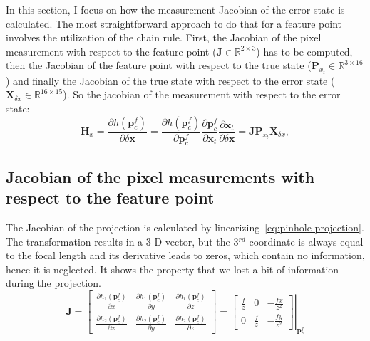 In this section, I focus on how the measurement Jacobian of the error state is calculated. The most straightforward approach to do that for a feature point involves the utilization of the chain rule. First, the Jacobian of the pixel measurement with respect to the feature point ($\mathbf{J}\in\mathbb{R}^{2\times3}$) has to be computed, then the Jacobian of the feature point with respect to the true state ($\mathbf{P}_{x_t}\in\mathbb{R}^{3\times 16}$) and finally the Jacobian of the true state with respect to the error state ($\mathbf{X}_{\delta x}\in\mathbb{R}^{16\times 15}$). So the jacobian of the measurement with respect to the error state:
\begin{equation}
    \mathbf{H}_x=\frac{\partial h(\mathbf{p}_c^f)}{\partial\delta\mathbf{x}}= 
    \frac{\partial h(\mathbf{p}_c^f)}{\partial\mathbf{p}_c^f}
    \frac{\partial\mathbf{p}_c^f}{\partial\mathbf{x}_t}
    \frac{\partial\mathbf{x}_t}{\partial\delta\mathbf{x}} =\mathbf{J}\mathbf{P}_{x_t}\mathbf{X}_{\delta x},
\end{equation} 

\subsection*{Jacobian of the pixel measurements with respect to the feature point}

The Jacobian of the projection is calculated by linearizing~\eqref{eq:pinhole-projection}. The transformation results in a 3-D vector, but the 3$^{rd}$ coordinate is always equal to the focal length and its derivative leads to zeros, which contain no information, hence it is neglected. It shows the property that we lost a bit of information during the projection.
\begin{equation}
    \mathbf{J}=\begin{bmatrix}
        \frac{\partial h_1(\mathbf{p}_c^f)}{\partial x} & \frac{\partial h_1(\mathbf{p}_c^f)}{\partial y} & \frac{\partial h_1(\mathbf{p}_c^f)}{\partial z} \\
        \frac{\partial h_2(\mathbf{p}_c^f)}{\partial x} & \frac{\partial h_2(\mathbf{p}_c^f)}{\partial y} & \frac{\partial h_2(\mathbf{p}_c^f)}{\partial z}
    \end{bmatrix} = \left.\begin{bmatrix}
        \frac{f}{z} & 0 & -\frac{fx}{z^2} \\
        0 & \frac{f}{z} & -\frac{fy}{z^2}
    \end{bmatrix}\right\vert_{\mathbf{p}_c^f}
    \label{eq:p-der-by-xt}
\end{equation}


